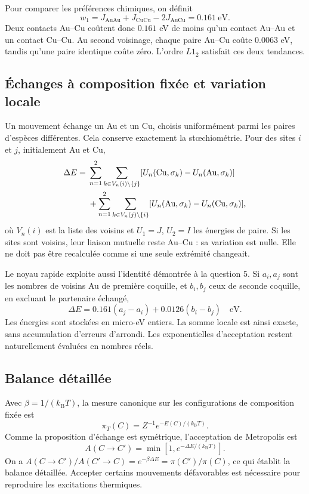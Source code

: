 \documentclass[10pt,a4paper]{article}
\newcommand{\Au}{\mathrm{Au}}
\newcommand{\Cu}{\mathrm{Cu}}
\newcommand{\kb}{k_{\mathrm B}}
\begin{document}
Pour comparer les préférences chimiques, on définit
\[
w_1=J_{\Au\Au}+J_{\Cu\Cu}-2J_{\Au\Cu}=0.161\ \mathrm{eV}.
\]
Deux contacts Au--Cu coûtent donc $0.161$ eV de moins qu'un contact Au--Au
et un contact Cu--Cu. Au second voisinage, chaque paire Au--Cu coûte
$0.0063$ eV, tandis qu'une paire identique coûte zéro. L'ordre $L1_2$
satisfait ces deux tendances.

\subsection{Échanges à composition fixée et variation locale}
Un mouvement échange un Au et un Cu, choisis uniformément parmi les paires
d'espèces différentes. Cela conserve exactement la stœchiométrie.
Pour des sites $i$ et $j$, initialement Au et Cu,
\begin{align}
\Delta E={}&\sum_{n=1}^2\sum_{k\in V_n(i)\setminus\{j\}}
[U_n(\Cu,\sigma_k)-U_n(\Au,\sigma_k)]\notag\\
&+\sum_{n=1}^2\sum_{k\in V_n(j)\setminus\{i\}}
[U_n(\Au,\sigma_k)-U_n(\Cu,\sigma_k)],
\end{align}
où $V_n(i)$ est la liste des voisins et $U_1=J$, $U_2=I$ les énergies de paire.
Si les sites sont voisins, leur liaison mutuelle
reste Au--Cu : sa variation est nulle. Elle ne doit pas être recalculée comme
si une seule extrémité changeait.

Le noyau rapide exploite aussi l'identité démontrée à la question 5.
Si $a_i,a_j$ sont les nombres de voisins Au de première coquille, et
$b_i,b_j$ ceux de seconde coquille, en excluant le partenaire échangé,
\begin{equation}
\boxed{\Delta E=0.161(a_j-a_i)+0.0126(b_i-b_j)\quad\text{eV}.}
\end{equation}
Les énergies sont stockées en micro-eV entiers. La somme locale est ainsi
exacte, sans accumulation d'erreurs d'arrondi. Les exponentielles
d'acceptation restent naturellement évaluées en nombres réels.

\subsection{Balance détaillée}
Avec $\beta=1/(\kb T)$, la mesure canonique sur les configurations de composition fixée est
\[
\pi_T(C)=Z^{-1}e^{-E(C)/(\kb T)}.
\]
Comme la proposition d'échange est symétrique, l'acceptation de Metropolis est
\begin{equation}
\boxed{A(C\to C')=\min[1,e^{-\Delta E/(\kb T)}].}
\end{equation}
On a $A(C\to C')/A(C'\to C)=e^{-\beta\Delta E}=\pi(C')/\pi(C)$,
ce qui établit la balance détaillée. Accepter certains mouvements défavorables
est nécessaire pour reproduire les excitations thermiques.
\end{document}
